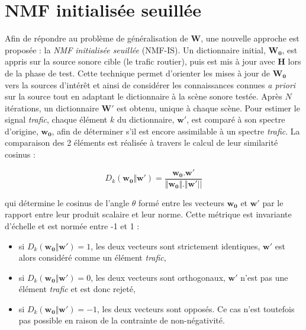 \section{NMF initialisée seuillée}\label{sec:NMF_TI}

Afin de répondre au problème de généralisation de $\mathbf{W}$, une nouvelle approche est proposée : la \textit{NMF initialisée seuillée} (NMF-IS). Un dictionnaire initial, $\mathbf{W_0}$, est appris sur la source sonore cible (le trafic routier), puis est mis à jour avec $\mathbf{H}$ lors de la phase de test.
Cette technique permet d'orienter les mises à jour de $\mathbf{W_0}$ vers la sources d'intérêt et ainsi de considérer les connaissances connues \textit{a priori} sur la source tout en adaptant le dictionnaire à la scène sonore testée. Après $N$ itérations, un dictionnaire $\mathbf{W'}$ est obtenu, unique à chaque scène. Pour estimer le signal \textit{trafic}, chaque élément $k$ du dictionnaire, $\mathbf{w'}$, est comparé à son spectre d'origine, $\mathbf{w_0}$, afin de déterminer s'il est encore assimilable à un spectre \textit{trafic}. La comparaison des 2 éléments est réalisée à travers le calcul de leur similarité cosinus :

\begin{equation}\label{eq:similarite_cosinus}
 D_{k}(\mathbf{w_0}\Vert\mathbf{w'}) = \frac{\mathbf{w_0}.\mathbf{w'}}{\Vert\mathbf{w_0}  \Vert. \Vert\mathbf{w'} \vert \vert}
\end{equation}

qui détermine le cosinus de l'angle $\theta$ formé entre les vecteurs $\mathbf{w_0}$ et $\mathbf{w'}$ par le rapport entre leur produit scalaire et leur norme. Cette métrique est invariante d'échelle et est normée entre -1 et 1 :

\begin{itemize}
\item si $D_{k}(\mathbf{w_0}\Vert\mathbf{w'}) = 1$, les deux vecteurs sont strictement identiques, $\mathbf{w'}$ est alors considéré comme un élément \textit{trafic},
\item si $D_{k}(\mathbf{w_0}\Vert\mathbf{w'}) = 0$, les deux vecteurs sont orthogonaux, $\mathbf{w'}$ n'est pas une élément \textit{trafic} et est donc rejeté,
\item si $D_{k}(\mathbf{w_0}\Vert\mathbf{w'}) = -1$, les deux vecteurs sont opposés. Ce cas n'est toutefois pas possible en raison de la contrainte de non-négativité.\\
\end{itemize}


